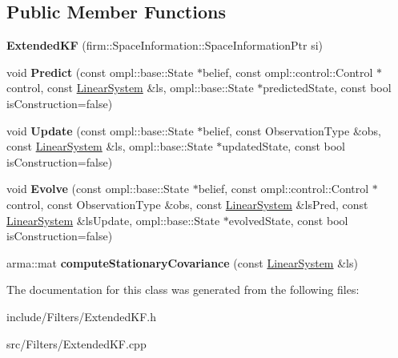 \subsection*{\-Public \-Member \-Functions}
\begin{DoxyCompactItemize}
\item 
\hypertarget{class_extended_k_f_a4fd20fe66ee89ad9c4103557afc9836c}{{\bfseries \-Extended\-K\-F} (firm\-::\-Space\-Information\-::\-Space\-Information\-Ptr si)}\label{class_extended_k_f_a4fd20fe66ee89ad9c4103557afc9836c}

\item 
\hypertarget{class_extended_k_f_a170d462f09601f768565093d0b3de1e9}{void {\bfseries \-Predict} (const ompl\-::base\-::\-State $\ast$belief, const ompl\-::control\-::\-Control $\ast$control, const \hyperlink{class_linear_system}{\-Linear\-System} \&ls, ompl\-::base\-::\-State $\ast$predicted\-State, const bool is\-Construction=false)}\label{class_extended_k_f_a170d462f09601f768565093d0b3de1e9}

\item 
\hypertarget{class_extended_k_f_a45f05b17a5fa6ee44988d18839c2ae33}{void {\bfseries \-Update} (const ompl\-::base\-::\-State $\ast$belief, const \-Observation\-Type \&obs, const \hyperlink{class_linear_system}{\-Linear\-System} \&ls, ompl\-::base\-::\-State $\ast$updated\-State, const bool is\-Construction=false)}\label{class_extended_k_f_a45f05b17a5fa6ee44988d18839c2ae33}

\item 
\hypertarget{class_extended_k_f_a54925e8fbd7109f4d72cfbc8e59d420d}{void {\bfseries \-Evolve} (const ompl\-::base\-::\-State $\ast$belief, const ompl\-::control\-::\-Control $\ast$control, const \-Observation\-Type \&obs, const \hyperlink{class_linear_system}{\-Linear\-System} \&ls\-Pred, const \hyperlink{class_linear_system}{\-Linear\-System} \&ls\-Update, ompl\-::base\-::\-State $\ast$evolved\-State, const bool is\-Construction=false)}\label{class_extended_k_f_a54925e8fbd7109f4d72cfbc8e59d420d}

\item 
\hypertarget{class_extended_k_f_a2aaf37aae5d4105c384f88b6c948e4cb}{arma\-::mat {\bfseries compute\-Stationary\-Covariance} (const \hyperlink{class_linear_system}{\-Linear\-System} \&ls)}\label{class_extended_k_f_a2aaf37aae5d4105c384f88b6c948e4cb}

\end{DoxyCompactItemize}


\-The documentation for this class was generated from the following files\-:\begin{DoxyCompactItemize}
\item 
include/\-Filters/\-Extended\-K\-F.\-h\item 
src/\-Filters/\-Extended\-K\-F.\-cpp\end{DoxyCompactItemize}
